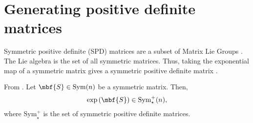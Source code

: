 \section{Generating positive definite matrices}
Symmetric positive definite (SPD) matrices are a subset of Matrix Lie Groups \cite{arsigny_geometric_2007}. The Lie algebra is the set of all symmetric matrices. Thus, taking the exponential map of a symmetric matrix gives a symmetric positive definite matrix \cite[Prop.~3.4]{arsigny_geometric_2007}.
\begin{proposition}
    From \cite[Prop.~3.4]{arsigny_geometric_2007}. Let $\mbf{S}\in \mathrm{Sym}(n)$ be a symmetric matrix. Then,
    \begin{align}
        \exp\left( \mbf{S} \right) \in \mathrm{Sym}^{+}_{\star}(n),
    \end{align}
    where $\mathrm{Sym}^{+}_{\star}$ is the set of symmetric positive definite matrices. 
\end{proposition}
